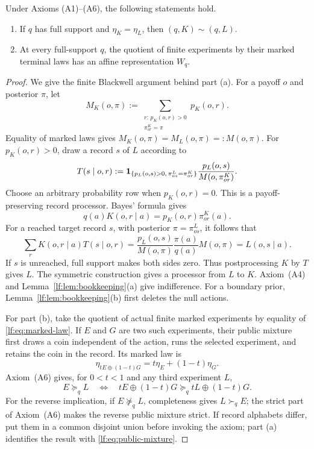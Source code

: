 \begin{lemma}\label{lf:lem:terminal-affine}
Under Axioms \textup{(A1)--(A6)}, the following statements hold.
\begin{enumerate}[label=\textup{(\alph*)},leftmargin=*]
\item If $q$ has full support and $\eta_K=\eta_L$, then
  $(q,K)\sim(q,L)$.
\item At every full-support $q$, the quotient of finite experiments by their
  marked terminal laws has an affine representation $W_q$.
\end{enumerate}
\end{lemma}

\begin{proof}
We give the finite Blackwell argument behind part \textup{(a)}.  For a payoff
$o$ and posterior $\pi$, let
\[
M_K(o,\pi):=
\sum_{\substack{r:\,p_K(o,r)>0\\ \pi^K_{or}=\pi}} p_K(o,r).
\]
Equality of marked laws gives $M_K(o,\pi)=M_L(o,\pi)=:M(o,\pi)$.
For $p_K(o,r)>0$, draw a record $s$ of $L$ according to
\begin{equation}
T(s\mid o,r):=
\mathbf 1_{\{p_L(o,s)>0,\,\pi^L_{os}=\pi^K_{or}\}}
\frac{p_L(o,s)}{M(o,\pi^K_{or})}.
\label{lf:eq:matching-processor}
\end{equation}
Choose an arbitrary probability row when $p_K(o,r)=0$.  This is a
payoff-preserving record processor.  Bayes' formula gives
\[
q(a)K(o,r\mid a)=p_K(o,r)\pi^K_{or}(a).
\]
For a reached target record $s$, with posterior $\pi=\pi^L_{os}$, it follows
that
\[
\sum_r K(o,r\mid a)T(s\mid o,r)
=\frac{p_L(o,s)}{M(o,\pi)}
  \frac{\pi(a)}{q(a)}M(o,\pi)
=L(o,s\mid a).
\]
If $s$ is unreached, full support makes both sides zero.  Thus postprocessing
$K$ by $T$ gives $L$.  The symmetric construction gives a
processor from $L$ to $K$.  Axiom~\textup{(A4)} and
Lemma~\ref{lf:lem:bookkeeping}\textup{(a)} give indifference.  For a boundary
prior, Lemma~\ref{lf:lem:bookkeeping}\textup{(b)} first deletes the null
actions.

For part \textup{(b)}, take the quotient of actual finite marked experiments by
equality of \eqref{lf:eq:marked-law}.  If $E$ and $G$ are two such experiments,
their public mixture first draws a coin independent of the action, runs the
selected experiment, and retains the coin in the record.  Its marked law is
\begin{equation}
\eta_{tE\oplus(1-t)G}=t\eta_E+(1-t)\eta_G.
\label{lf:eq:public-mixture}
\end{equation}
Axiom~\textup{(A6)} gives, for $0<t<1$ and any third experiment $L$,
\begin{equation}
E\succeq_q L
\quad\Longleftrightarrow\quad
tE\oplus(1-t)G\succeq_q tL\oplus(1-t)G.
\label{lf:eq:mixture-independence}
\end{equation}
For the reverse implication, if $E\not\succeq_q L$, completeness gives
$L\succ_q E$; the strict part of Axiom~\textup{(A6)} makes the reverse public
mixture strict.  If record
alphabets differ, put them in a common disjoint union before invoking the
axiom; part \textup{(a)} identifies the result with
\eqref{lf:eq:public-mixture}.


\end{proof}
